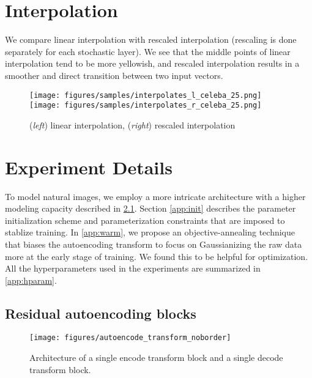 \documentclass{article}
\begin{document}





\clearpage
\appendix
\onecolumn

\section{Interpolation}
\label{app:inter}
We compare linear interpolation with rescaled interpolation (rescaling is done separately for each stochastic layer). 
We see that the middle points of linear interpolation tend to be more yellowish, and rescaled interpolation results in a smoother and direct transition between two input vectors.
\begin{figure*}[h!]
    \centering
    \texttt{[image: figures/samples/interpolates\_l\_celeba\_25.png]}
    \hfill
    \texttt{[image: figures/samples/interpolates\_r\_celeba\_25.png]}
    \caption{(\emph{left}) linear interpolation, (\emph{right}) rescaled interpolation}
    \label{fig:interpolate_compare}
\end{figure*}





\clearpage

\section{Experiment Details}
\label{app:exp}
To model natural images, we employ a more intricate architecture with a higher modeling capacity described in \ref{app:raeb}. 
Section \ref{app:init} describes the parameter initialization scheme and parameterization constraints that are imposed to stablize training. 
In \ref{app:warm}, we propose an objective-annealing technique that biases the autoencoding transform to 
focus on Gaussianizing the raw data more at the early stage of training.
We found this to be helpful for optimization. 
All the hyperparameters used in the experiments are summarized in \ref{app:hparam}. 


\subsection{Residual autoencoding blocks}
\label{app:raeb}
\begin{figure*}[h!]
	\centering
	\texttt{[image: figures/autoencode\_transform\_noborder]}
	\caption{Architecture of a single encode transform block and a single decode transform block.}
	\label{fig:autoencoding_block}
\end{figure*}
\end{document}
